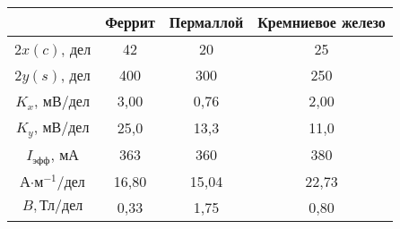 \begin{tabular}{cccc}
\toprule
& Феррит & Пермаллой & Кремниевое железо \\
\midrule
$2x(c)$, дел              & 42    & 20    & 25    \\
$2y(s)$, дел              & 400   & 300   & 250   \\
$K_x$, мВ/дел               & 3,00  & 0,76  & 2,00  \\
$K_y$, мВ/дел               & 25,0  & 13,3  & 11,0  \\
$I_\text{эфф}$, мА          & 363   & 360   & 380   \\
А$\cdot$м$^{-1}/\text{дел}$ & 16,80 & 15,04 & 22,73 \\
$B, \text{Тл}/\text{дел}$   & 0,33  & 1,75  & 0,80  \\
\bottomrule
\end{tabular}
